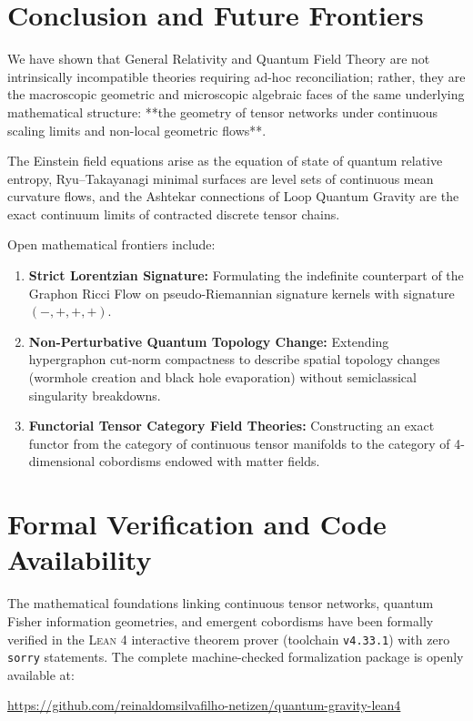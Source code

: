 \documentclass[11pt,a4paper,reqno]{amsart}
\theoremstyle{definition}
\numberwithin{equation}{section}
\begin{document}
\section{Conclusion and Future Frontiers}
\label{sec:conclusion}

We have shown that General Relativity and Quantum Field Theory are not intrinsically incompatible theories requiring ad-hoc reconciliation; rather, they are the macroscopic geometric and microscopic algebraic faces of the same underlying mathematical structure: **the geometry of tensor networks under continuous scaling limits and non-local geometric flows**.

The Einstein field equations arise as the equation of state of quantum relative entropy, Ryu--Takayanagi minimal surfaces are level sets of continuous mean curvature flows, and the Ashtekar connections of Loop Quantum Gravity are the exact continuum limits of contracted discrete tensor chains.

Open mathematical frontiers include:
\begin{enumerate}
    \item \textbf{Strict Lorentzian Signature:} Formulating the indefinite counterpart of the Graphon Ricci Flow on pseudo-Riemannian signature kernels with signature $(-, +, +, +)$.
    \item \textbf{Non-Perturbative Quantum Topology Change:} Extending hypergraphon cut-norm compactness to describe spatial topology changes (wormhole creation and black hole evaporation) without semiclassical singularity breakdowns.
    \item \textbf{Functorial Tensor Category Field Theories:} Constructing an exact functor from the category of continuous tensor manifolds to the category of 4-dimensional cobordisms endowed with matter fields.
\end{enumerate}

\section*{Formal Verification and Code Availability}
The mathematical foundations linking continuous tensor networks, quantum Fisher information geometries, and emergent cobordisms have been formally verified in the \textsc{Lean 4} interactive theorem prover (toolchain \texttt{v4.33.1}) with zero \texttt{sorry} statements. The complete machine-checked formalization package is openly available at:
\begin{center}
\url{https://github.com/reinaldomsilvafilho-netizen/quantum-gravity-lean4}
\end{center}
\end{document}
